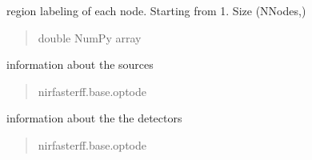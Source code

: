 \documentclass[letterpaper,10pt,english]{sphinxmanual}
\begin{document}
\begin{fulllineitems}

\begin{fulllineitems}
\label{\detokenize{_autosummary/nirfasterff.base.dcs_mesh.dcsmesh:nirfasterff.base.dcs_mesh.dcsmesh.region}}
\pysigstartsignatures
{}
\pysigstopsignatures
\sphinxAtStartPar
region labeling of each node. Starting from 1. Size (NNodes,)
\begin{quote}\begin{description}
\sphinxAtStartPar
double NumPy array

\end{description}\end{quote}

\end{fulllineitems}


\begin{fulllineitems}
\label{\detokenize{_autosummary/nirfasterff.base.dcs_mesh.dcsmesh:nirfasterff.base.dcs_mesh.dcsmesh.source}}
\pysigstartsignatures
{}
\pysigstopsignatures
\sphinxAtStartPar
information about the sources
\begin{quote}\begin{description}
\sphinxAtStartPar
nirfasterff.base.optode

\end{description}\end{quote}

\end{fulllineitems}


\begin{fulllineitems}
\label{\detokenize{_autosummary/nirfasterff.base.dcs_mesh.dcsmesh:nirfasterff.base.dcs_mesh.dcsmesh.meas}}
\pysigstartsignatures
{}
\pysigstopsignatures
\sphinxAtStartPar
information about the the detectors
\begin{quote}\begin{description}
\sphinxAtStartPar
nirfasterff.base.optode


\end{description}
\end{quote}
\end{fulllineitems}
\end{fulllineitems}
\end{document}
